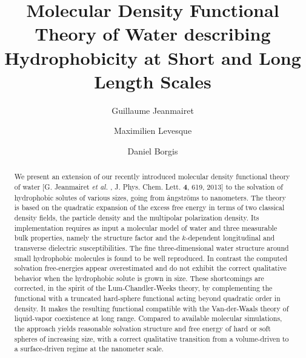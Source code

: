 \documentclass[aip,jcp,showpacs,amsmath,amssymb,superscriptaddress]{revtex4-1}
\newcommand{\etal}{{\em et  al. }}
\newcommand{\angstrom}{\r{a}ngstr\"{o}m}
\begin{document}
\title{Molecular Density Functional Theory of Water describing Hydrophobicity at Short and Long Length Scales}



\author{Guillaume Jeanmairet}

\author{Maximilien Levesque}

\author{Daniel Borgis}


\begin{abstract}
We present an extension of our recently introduced molecular density functional theory of water [G. Jeanmairet \etal, J. Phys. Chem. Lett. {\bf 4}, 619, 2013] to the solvation of hydrophobic solutes of various sizes, going from \angstrom s to nanometers. The theory is based on the quadratic expansion of the excess free energy in terms of two classical density fields, the particle density and the multipolar polarization density. Its implementation requires as input a molecular model of water and three measurable bulk properties, namely the structure factor and the $k$-dependent longitudinal and transverse dielectric susceptibilities. The fine three-dimensional water structure around small hydrophobic molecules is found to be well reproduced. In contrast the computed solvation free-energies appear overestimated and do not exhibit the correct qualitative behavior when the hydrophobic solute is grown in size. These shortcomings are corrected, in the spirit of the Lum-Chandler-Weeks theory, by complementing the functional with a truncated hard-sphere functional acting beyond quadratic order in density. It makes the resulting functional compatible with the Van-der-Waals theory of liquid-vapor coexistence at long range. Compared to available molecular simulations, the approach yields reasonable solvation structure and free energy of hard or soft spheres of increasing size, with a correct qualitative transition from a volume-driven to a surface-driven regime at the nanometer scale.
\end{abstract}


\maketitle
\end{document}
